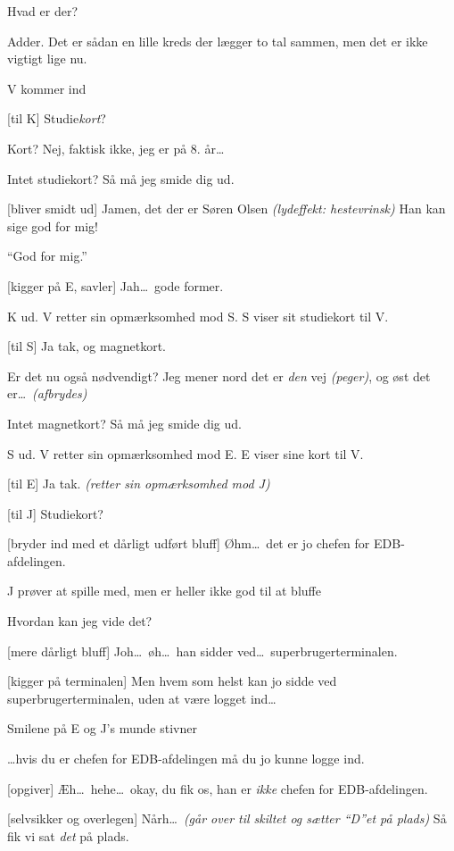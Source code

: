 \documentclass[danish]{article}
\begin{document}
\begin{sketch}
 Hvad er der?

 Adder. Det er sådan en lille kreds der lægger to tal sammen, men det er
ikke vigtigt lige nu.

\scene V kommer ind

[til K] Studie\emph{kort}?

 Kort? Nej, faktisk ikke, jeg er på 8. år\ldots

 Intet studiekort? Så må jeg smide dig ud.

[bliver smidt ud] Jamen, det der er Søren Olsen \emph{(lydeffekt:
  hestevrinsk)} Han kan sige god for mig!

 ``God for mig.''

[kigger på E, savler] Jah\ldots\ gode former.

\scene K ud. V retter sin opmærksomhed mod S. S viser sit studiekort til V.

[til S] Ja tak, og magnetkort.

 Er det nu også nødvendigt? Jeg mener nord det er \emph{den} vej
\emph{(peger)}, og øst det er\ldots\ \emph{(afbrydes)}

 Intet magnetkort? Så må jeg smide dig ud.

\scene S ud. V retter sin opmærksomhed mod E. E viser sine kort til V.

[til E] Ja tak. \emph{(retter sin opmærksomhed mod J)}

[til J] Studiekort?

[bryder ind med et dårligt udført bluff] Øhm\ldots\ det er jo chefen for
EDB-afdelingen.

\scene J prøver at spille med, men er heller ikke god til at bluffe

 Hvordan kan jeg vide det?

[mere dårligt bluff] Joh\ldots\ øh\ldots\ han sidder ved\ldots\
superbrugerterminalen.

[kigger på terminalen] Men hvem som helst kan jo sidde ved
superbrugerterminalen, uden at være logget ind\ldots

\scene Smilene på E og J's munde stivner

 \ldots hvis du er chefen for EDB-afdelingen må du jo kunne logge ind.

[opgiver] Æh\ldots\ hehe\ldots\ okay, du fik os, han er \emph{ikke}
chefen for EDB-afdelingen.

[selvsikker og overlegen] Nårh\ldots\ \emph{(går over til skiltet og
  sætter ``D''et på plads)} Så fik vi sat \emph{det} på plads.


\end{sketch}
\end{document}
